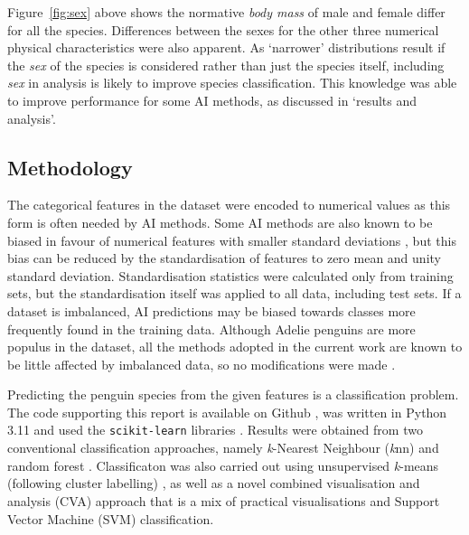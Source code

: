 \documentclass[a4paper, 11pt]{article}
\begin{document}
Figure~\ref{fig:sex} above shows the normative \textit{body mass} of male and female differ for all the species. 
Differences between the sexes for the other three numerical physical characteristics were also apparent. 
As `narrower' distributions result if the \textit{sex} of the species is considered 
rather than just the species itself, including \textit{sex} in analysis is likely to improve species classification. 
This knowledge was able to improve performance for some AI methods, as discussed in `results and analysis'.

\subsection*{Methodology}

The categorical features in the dataset were encoded to numerical values as this form is often needed by AI methods. 
Some AI methods are also known to be biased in favour of numerical features 
with smaller standard deviations \cite{hastie2009elements}, but this bias can be reduced by the standardisation 
of features to zero mean and unity standard deviation. Standardisation statistics were calculated only from 
training sets, but the standardisation itself was applied to all data, including test sets. 
If a dataset is imbalanced, AI predictions may be biased towards classes more frequently found in the training data. 
Although Adelie penguins are more populus in the dataset, all the methods adopted in the current work are known to be little affected by 
imbalanced data, so no modifications were made \cite{he2009learning}.

Predicting the penguin species from the given features is a classification problem. 
The code supporting this report is available on Github \cite{TimAIRepo}, was written in Python 3.11 \cite{python311} 
and used the \texttt{scikit-learn} libraries \cite{scikit-learn}.
Results were obtained from two conventional classification approaches, 
namely \textit{k}-Nearest Neighbour (\textit{k}nn) \cite{bishop2006pattern} and random forest \cite{breiman2001random}.
Classificaton was also carried out using 
unsupervised \textit{k}-means (following cluster labelling) \cite{tan2005introduction}, 
as well as a novel combined visualisation and analysis (CVA) approach that is a mix of 
practical visualisations and Support Vector Machine (SVM) classification.
\end{document}

